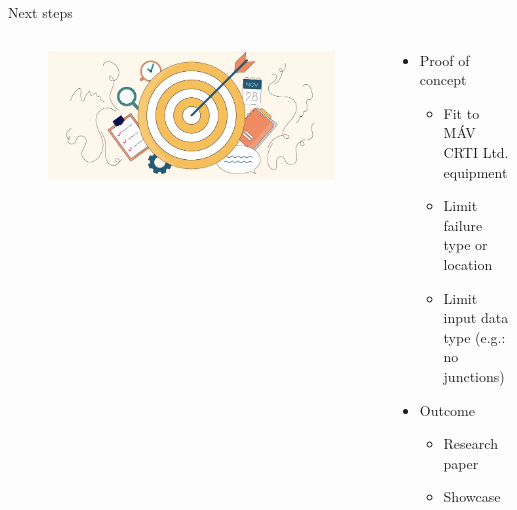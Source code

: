\documentclass[aspectratio=169]{beamer}
\begin{document}
\begin{frame}{Next steps}
    \begin{columns}
        \begin{column}{0.3\textwidth}
            \begin{figure}[H]
                \centering
                \includegraphics[width=\textwidth]{./tex_images/goal_setting.jpg}
            \end{figure}
        \end{column}
        \begin{column}{0.65\textwidth}
            \begin{itemize}
                \item Proof of concept
                      \begin{itemize}
                          \item Fit to MÁV CRTI Ltd. equipment
                          \item Limit failure type or location
                          \item Limit input data type (e.g.: no junctions)
                      \end{itemize}
                \item Outcome
                      \begin{itemize}
                          \item Research paper
                          \item Showcase
                      \end{itemize}
            \end{itemize}
        \end{column}
    \end{columns}
\end{frame}
\end{document}
